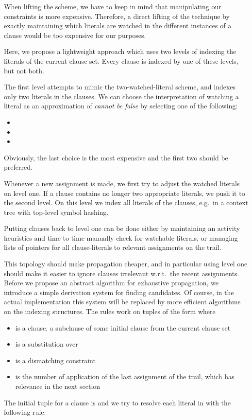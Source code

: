 \documentclass[a4paper]{article}
\begin{document}
{When lifting the scheme, we have to keep in mind that manipulating our constraints is more expensive.
Therefore, a direct lifting of the technique by exactly maintaining which literals are watched in the different instances of a clause would be 
too expensive for our purposes.

Here, we propose a lightweight approach which uses two levels of indexing the literals of the current clause set.
Every clause is indexed by one of these levels, but not both.

The first level attempts to mimic the two-watched-literal scheme, and indexes only two literals in the clauses. 
We can choose the interpretation of watching a literal  as an approximation of \emph{cannot be false} by selecting one of the following:
\begin{itemize}
	\item 
	\item 
	\item 
\end{itemize}
Obviously, the last choice is the most expensive and the first two should be preferred.

Whenever a new assignment is made, we first try to adjust the watched literals on level one. If a clause contains no longer two appropriate literals, we push it to the second level.
On this level we index all literals of the clauses, 
e.g.\ in a context tree with top-level symbol hashing. 

Putting clauses back to level one can be done either by maintaining an activity heuristics and time to time manually check for watchable literals, or managing lists of pointers for all clause-literals to relevant assignments 
on the trail.

This topology should make propagation cheaper, and in particular 
using level one should make it easier to ignore clauses irrelevant w.r.t.\ the recent assignments.
Before we propose an abstract algorithm for exhaustive propagation, 
we introduce a simple derivation system for finding candidates. 
Of course, in the actual implementation this system will be replaced by more efficient algorithms on 
the indexing structures. 
\leaveabit\noindent
The rules work on tuples of the form  where
\begin{itemize}
	\item  is a clause, a subclause of some initial clause  from the current clause set
	\item  is a substitution over 
	\item  is a dismatching constraint 
	\item  is the number of application of the last assignment of the trail, which has relevance in the next section
\end{itemize}
The initial tuple for a clause  is  and we try to resolve each literal in  with the following rule:

}
\end{document}
